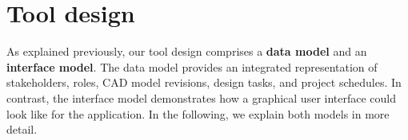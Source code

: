 \section{Tool design}
\label{sec:contribution}

As explained previously, our tool design comprises a \textbf{data model} and an \textbf{interface model}.
The data model provides an integrated representation of stakeholders, roles, CAD model revisions, design tasks, and project schedules.
In contrast, the interface model demonstrates how a graphical user interface could look like for the application.
In the following, we explain both models in more detail.


%
